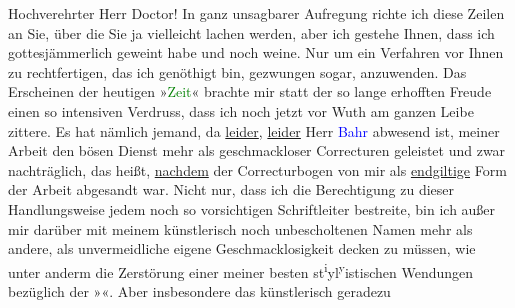 \pstart\center{}Hochverehrter Herr Doctor!\pend\vspace{0.5em}
\pstart
           In ganz unsagbarer Aufregung richte ich diese Zeilen an Sie, über die Sie ja
                    vielleicht lachen werden, aber ich gestehe Ihnen, dass ich gottesjämmerlich
                    geweint habe und noch weine. Nur um ein Verfahren vor Ihnen zu rechtfertigen,
                    das ich genöthigt bin, gezwungen sogar, anzuwenden. Das {\pb}Erscheinen der
                    heutigen »\textcolor{green}{Zeit}{}\ledrightnote{\textcolor{green}{Die Zeit. Wiener Wochenschrift}}« brachte mir statt der so
                    lange erhofften Freude einen so intensiven Verdruss, dass ich noch jetzt vor
                    Wuth am ganzen Leibe zittere. Es hat nämlich jemand, da \uline{leider}, \uline{leider} Herr \textcolor{blue}{Bahr}{}\ledrightnote{\textcolor{blue}{Hermann Bahr}} abwesend ist, meiner Arbeit den
                    bösen Dienst mehr als geschmackloser Correcturen geleistet und zwar
                    nachträglich, das heißt, \uline{nachdem} der
                    Correcturbogen von mir als \uline{endgiltige} Form der
                    Arbeit abgesandt war. Nicht nur, dass ich die Berech{\pb}tigung zu dieser
                    Handlungsweise jedem noch so vorsichtigen Schriftleiter bestreite, bin ich außer
                    mir darüber mit meinem künstlerisch noch unbescholtenen Namen mehr als andere,
                    als unvermeidliche eigene Geschmacklosigkeit decken zu müssen, wie unter anderm
                    die Zerstörung einer meiner besten st\substVorne{}\textsuperscript{i}\substDazwischen{}y\substHinten{}l\substVorne{}\textsuperscript{y}\substDazwischen{}i\substHinten{}stischen Wendungen bezüglich
                    der »\label{K_L03697-1v}\label{}«. Aber insbesondere das künstlerisch geradezu
